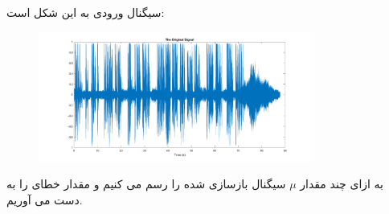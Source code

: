 \documentclass[a4paper]{article}
\begin{document}
\subsection{}
سیگنال ورودی به این شکل است:
\begin{figure}[H]
	\includegraphics[width=0.8\textwidth]{comsys_fig59.png}\\ 
	\centering
\end{figure}
\newpage
به ازای چند مقدار 
$\mu$
سیگنال بازسازی شده را رسم می کنیم و مقدار خطای  را به دست می آوریم.
\end{document}
